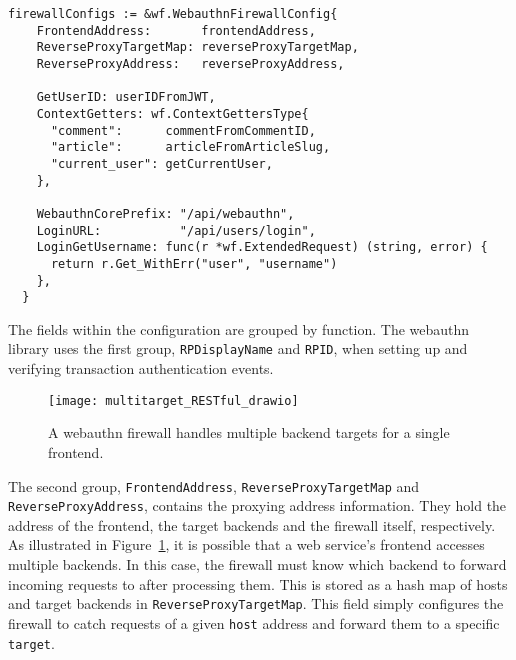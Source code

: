 \begin{lstlisting}[float=h]
  firewallConfigs := &wf.WebauthnFirewallConfig{
    FrontendAddress:       frontendAddress,
    ReverseProxyTargetMap: reverseProxyTargetMap,
    ReverseProxyAddress:   reverseProxyAddress,

    GetUserID: userIDFromJWT,
    ContextGetters: wf.ContextGettersType{
      "comment":      commentFromCommentID,
      "article":      articleFromArticleSlug,
      "current_user": getCurrentUser,
    },

    WebauthnCorePrefix: "/api/webauthn",
    LoginURL:           "/api/users/login",
    LoginGetUsername: func(r *wf.ExtendedRequest) (string, error) {
      return r.Get_WithErr("user", "username")
    },
  }
\end{lstlisting}

The fields within the configuration are grouped by function. The webauthn library uses the first group, \lstinline{RPDisplayName} and \lstinline{RPID}, when setting up and verifying transaction authentication events. 

\begin{figure}[h]
  \centering
  \texttt{[image: multitarget\_RESTful\_drawio]}
  \caption{A webauthn firewall handles multiple backend targets for a single frontend.}
  \label{Fig:MultiTargetRESTful}
\end{figure}

The second group, \lstinline{FrontendAddress}, \lstinline{ReverseProxyTargetMap} and \lstinline{ReverseProxyAddress}, contains the proxying address information. They hold the address of the frontend, the target backends and the firewall itself, respectively. As illustrated in Figure~\ref{Fig:MultiTargetRESTful}, it is possible that a web service's frontend accesses multiple backends. In this case, the firewall must know which backend to forward incoming requests to after processing them. This is stored as a hash map of hosts and target backends in \lstinline{ReverseProxyTargetMap}. This field simply configures the firewall to catch requests of a given \lstinline{host} address and forward them to a specific \lstinline{target}.


